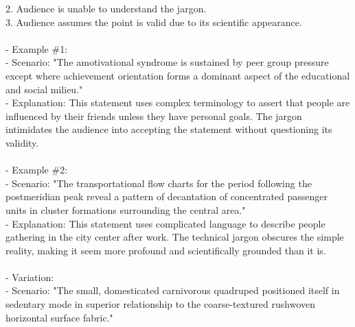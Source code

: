 \documentclass[a4paper,12pt,single,pdftex]{scrartcl}
\begin{document}
    
        2. Audience is unable to understand the jargon.
    \\

    
        3. Audience assumes the point is valid due to its scientific appearance.
    \\

    
      
    \\

    
      - Example \#1:
    \\

    
        - Scenario: "The amotivational syndrome is sustained by peer group pressure except where achievement orientation forms a dominant aspect of the educational and social milieu."
    \\

    
        - Explanation: This statement uses complex terminology to assert that people are influenced by their friends unless they have personal goals. The jargon intimidates the audience into accepting the statement without questioning its validity.
    \\

    
      
    \\

    
      - Example \#2:
    \\

    
        - Scenario: "The transportational flow charts for the period following the postmeridian peak reveal a pattern of decantation of concentrated passenger units in cluster formations surrounding the central area."
    \\

    
        - Explanation: This statement uses complicated language to describe people gathering in the city center after work. The technical jargon obscures the simple reality, making it seem more profound and scientifically grounded than it is.
    \\

    
      
    \\

    
      - Variation:
    \\

    
        - Scenario: "The small, domesticated carnivorous quadruped positioned itself in sedentary mode in superior relationship to the coarse-textured rushwoven horizontal surface fabric."
    \\
\end{document}

